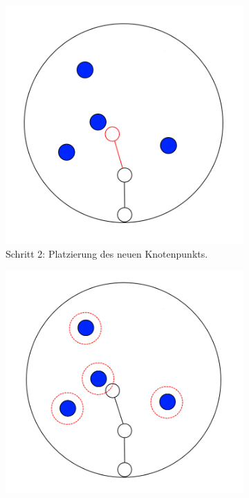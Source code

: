\begin{figure} [hbtp]
	\begin{subfigure}[t]{.31\textwidth}
		\centering
		\includegraphics[width=\linewidth]{images/SCA_Basic4.png}
		\caption{Schritt 2: Platzierung des neuen Knotenpunkts.}
		\label{subfig:SCA_Basic4}
	\end{subfigure}
	\hspace{.01\textwidth}
	\begin{subfigure}[t]{.31\textwidth}
		\centering
		\includegraphics[width=\linewidth]{images/SCA_Basic5.png}

\end{subfigure}
\end{figure}
